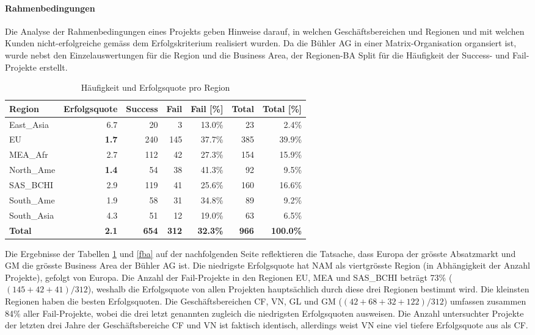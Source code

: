 \paragraph{Rahmenbedingungen}
Die Analyse der Rahmenbedingungen eines Projekts geben Hinweise darauf, in welchen Geschäftsbereichen und Regionen und mit welchen Kunden nicht-erfolgreiche gemäss dem Erfolgskriterium realisiert wurden. Da die Bühler AG in einer Matrix-Organisation organsiert ist, wurde nebst den Einzelauswertungen für die Region und die Business Area, der Regionen-BA Split für die Häufigkeit der Success- und Fail-Projekte erstellt.
\begin{table}[H]
	\centering
	\caption{Häufigkeit und Erfolgsquote pro Region}
	\begin{tabular}{lrrrrrr}
		\textbf{Region} & \multicolumn{1}{l}{\textbf{Erfolgsquote}} & \multicolumn{1}{l}{\textbf{Success}} & \multicolumn{1}{l}{\textbf{Fail}} & \multicolumn{1}{l}{\textbf{Fail [\%]}} & \multicolumn{1}{l}{\textbf{Total}} & \multicolumn{1}{l}{\textbf{Total [\%]}} \\ \hline
		East\_Asia & 6.7   & 20    & 3     & 13.0\% & 23    & 2.4\% \\
		EU    & \textbf{1.7}   & 240   & 145   & 37.7\% & 385   & 39.9\% \\
		MEA\_Afr & 2.7   & 112   & 42    & 27.3\% & 154   & 15.9\% \\
		North\_Ame & \textbf{1.4}   & 54    & 38    & 41.3\% & 92    & 9.5\% \\
		SAS\_BCHI & 2.9   & 119   & 41    & 25.6\% & 160   & 16.6\% \\
		South\_Ame & 1.9   & 58    & 31    & 34.8\% & 89    & 9.2\% \\
		South\_Asia & 4.3   & 51    & 12    & 19.0\% & 63    & 6.5\% \\ \hline
		\textbf{Total} & \textbf{2.1} & \textbf{654} & \textbf{312} & \textbf{32.3\%} & \textbf{966} & \textbf{100.0\%} \\
	\end{tabular}%
	\label{freg}%
\end{table}%
Die Ergebnisse der Tabellen \ref{freg} und \ref{fba} auf der nachfolgenden Seite reflektieren die Tatsache, dass Europa der grösste Absatzmarkt und GM die grösste Business Area der Bühler AG ist. Die niedrigste Erfolgsquote hat NAM als viertgrösste Region (in Abhängigkeit der Anzahl Projekte), gefolgt von Europa. Die Anzahl der Fail-Projekte in den Regionen EU, MEA und SAS\_BCHI beträgt 73\% ($(145+42+41)/312$), weshalb die Erfolgsquote von allen Projekten hauptsächlich durch diese drei Regionen bestimmt wird. Die kleinsten Regionen haben die besten Erfolgsquoten. Die Geschäftsbereichen CF, VN, GL und GM ($(42+68+32+122)/312$) umfassen zusammen 84\% aller Fail-Projekte, wobei die drei letzt genannten zugleich die niedrigsten Erfolgsquoten ausweisen. Die Anzahl untersuchter Projekte der letzten drei Jahre der Geschäftsbereiche CF und VN ist faktisch identisch, allerdings weist VN eine viel tiefere Erfolgsquote aus als CF.
